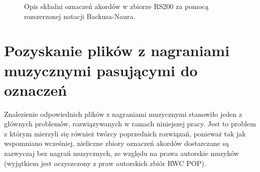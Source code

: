 \begin{figure}
    \centering
    \caption{Opis składni oznaczeń akordów w zbiorze RS200 za pomocą rozszerzonej notacji Backusa-Naura.}
    \label{fig:rs200_dt_syntax}
    {\scriptsize }
\end{figure}


\section{Pozyskanie plików z nagraniami muzycznymi pasującymi do oznaczeń}

Znalezienie odpowiednich plików z nagraniami muzycznymi stanowiło jeden z głównych problemów,
rozwiązywanych w ramach niniejszej pracy. Jest to problem z którym mierzyli się również twórcy
poprzednich rozwiązań, ponieważ tak jak wspomniano wcześniej, nieliczne zbiory oznaczeń
akordów dostarczane są zazwyczaj bez nagrań muzycznych, ze względu na prawa autorskie muzyków
(wyjątkiem jest oczyszczony z praw autorskich zbiór RWC POP).

